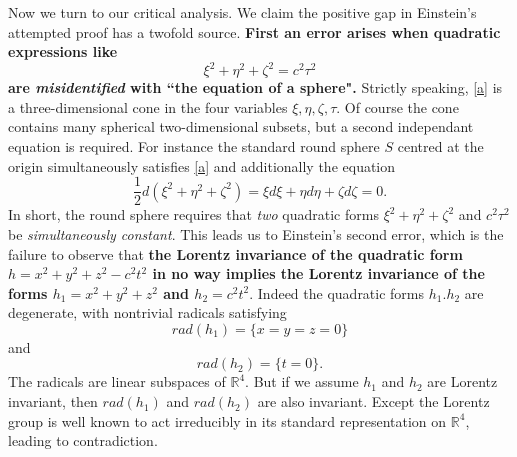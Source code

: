 \documentclass[12pt]{amsart}
\theoremstyle{definition}
\theoremstyle{remark}
\newcommand{\bR}{\mathbb{R}}
\newcommand{\del}{\partial}
\begin{document}
Now we turn to our critical analysis. We claim the positive gap in Einstein's attempted proof has a twofold source. \textbf{First an error arises when quadratic expressions like \begin{equation}\label{a}\xi^2+\eta^2+\zeta^2=c^2 \tau^2
\end{equation} are \emph{misidentified} with ``the equation of a sphere".} Strictly speaking, \eqref{a} is a three-dimensional cone in the four variables $\xi, \eta, \zeta, \tau$. Of course the cone contains many spherical two-dimensional subsets, but a second independant equation is required. For instance the standard round sphere $S$ centred at the origin simultaneously satisfies \eqref{a} and additionally the equation $$\frac{1}{2}d(\xi^2+\eta^2+\zeta^2)=\xi d\xi+\eta d\eta +\zeta d\zeta=0.$$ In short, the round sphere requires that \emph{two} quadratic forms $\xi^2+\eta^2+\zeta^2$ and $c^2\tau^2$ be \emph{simultaneously constant}. This leads us to Einstein's second error, which is the failure to observe that \textbf{the Lorentz invariance of the quadratic form $h=x^2+y^2+z^2-c^2t^2$ in no way implies the Lorentz invariance of the forms $h_1=x^2+y^2+z^2$ and $h_2=c^2 t^2.$ } Indeed the quadratic forms $h_1. h_2$ are degenerate, with nontrivial radicals satisfying $$rad(h_1)=\{x=y=z=0\}$$ and $$rad(h_2)=\{t=0\}.$$ The radicals are linear subspaces of $\bR^4$. But if we assume $h_1$ and $h_2$ are Lorentz invariant, then $rad(h_1)$ and $rad(h_2)$ are also invariant. Except the Lorentz group is well known to act irreducibly in its standard representation on $\bR^4$, leading to contradiction.





\end{document}
